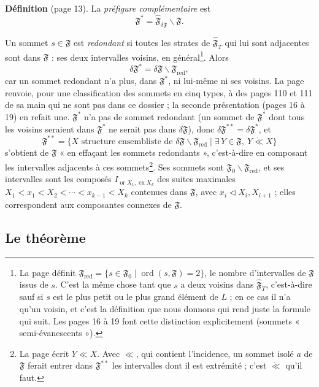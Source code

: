 \documentclass[11pt,a4paper]{article}
\begin{document}
\textbf{Définition} (page 13). La \emph{préfigure complémentaire} est
\[
\mathfrak{F}^{*} = \widehat{\mathfrak{F}}_{\delta\mathfrak{F}} \smallsetminus
\mathfrak{F}.
\]

Un sommet $s \in \mathfrak{F}$ est \emph{redondant} si toutes les strates de
$\widehat{\mathfrak{F}}_{T}$ qui lui sont adjacentes sont dans $\mathfrak{F}$ :
ses deux intervalles voisins, en général\footnote{La page définit
$\mathfrak{F}_{\mathrm{red}} = \{s \in \mathfrak{F}_{0} \mid
\operatorname{ord}(s, \mathfrak{F}) = 2\}$, le nombre d'intervalles de
$\mathfrak{F}$ issus de $s$. C'est la même chose tant que $s$ a deux voisins
dans $\widehat{\mathfrak{F}}_{T}$, c'est-à-dire sauf si $s$ est le plus petit ou
le plus grand élément de $L$ ; en ce cas il n'a qu'un voisin, et c'est la
définition que nous donnons qui rend juste la formule qui suit. Les pages 16 à
19 font cette distinction explicitement (sommets « semi-évanescents »).}. Alors
\[
\delta \mathfrak{F}^{*} = \delta \mathfrak{F} \smallsetminus
\mathfrak{F}_{\mathrm{red}},
\]
car un sommet redondant n'a plus, dans $\mathfrak{F}^{*}$, ni lui-même ni ses
voisins. La page renvoie, pour une classification des sommets en cinq types, à
des pages 110 et 111 de sa main qui ne sont pas dans ce dossier ; la seconde
présentation (pages 16 à 19) en refait une. $\mathfrak{F}^{*}$ n'a pas de sommet
redondant (un sommet de $\mathfrak{F}^{*}$ dont tous les voisins seraient
dans $\mathfrak{F}^{*}$ ne serait pas dans $\delta\mathfrak{F}$), donc $\delta
\mathfrak{F}^{**} = \delta \mathfrak{F}^{*}$, et
\[
\mathfrak{F}^{**} = \{ X \text{ structure ensembliste de } \delta\mathfrak{F}
\smallsetminus \mathfrak{F}_{\mathrm{red}} \mid \exists\, Y \in \mathfrak{F},\
Y \mathrel{\mathring{\ll}} X \}
\]
s'obtient de $\mathfrak{F}$ « en effaçant les sommets redondants », c'est-à-dire
en composant les intervalles adjacents à ces sommets\footnote{La page écrit $Y
\ll X$. Avec $\ll$, qui contient l'incidence, un sommet isolé $a$ de
$\mathfrak{F}$ ferait entrer dans $\mathfrak{F}^{**}$ les intervalles dont il
est extrémité ; c'est $\mathrel{\mathring{\ll}}$ qu'il faut.}. Ses sommets sont
$\mathfrak{F}_{0} \smallsetminus \mathfrak{F}_{\mathrm{red}}$, et ses
intervalles sont les composés $I_{\operatorname{or} X_{1}, \operatorname{ex}
X_{k}}$ des suites maximales $X_{1} < x_{1} < X_{2} < \cdots < x_{k-1} < X_{k}$
contenues dans $\mathfrak{F}$, avec $x_{i} \lhd X_{i}, X_{i+1}$ ; elles
correspondent aux composantes connexes de $\mathfrak{F}$.

\subsection*{Le théorème}
\end{document}
